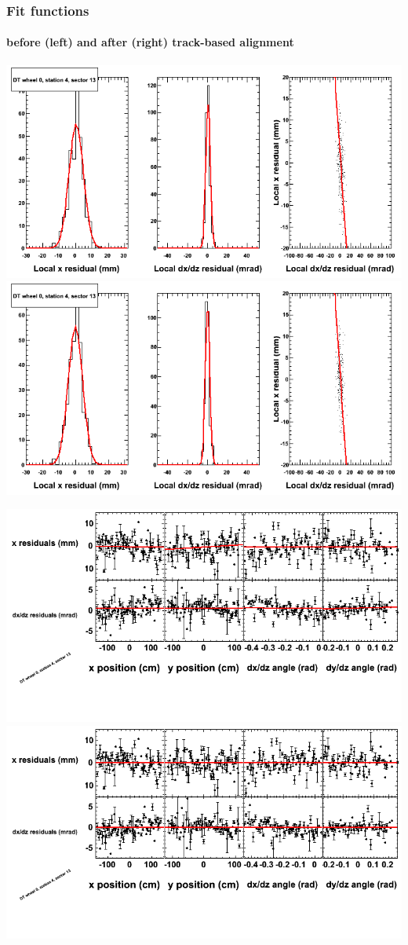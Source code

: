 \documentclass[compress]{beamer}
\begin{document}
\begin{frame}
\frametitle{Fit functions}
\framesubtitle{before (left) and after (right) track-based alignment}
\includegraphics[width=0.5\linewidth]{fitfunctions_re01/MBwhCst4sec13_bellcurves.png} \includegraphics[width=0.5\linewidth]{fitfunctions_re05/MBwhCst4sec13_bellcurves.png}

\includegraphics[width=0.5\linewidth]{fitfunctions_re01/MBwhCst4sec13_polynomials.png} \includegraphics[width=0.5\linewidth]{fitfunctions_re05/MBwhCst4sec13_polynomials.png}
\end{frame}
\end{document}
